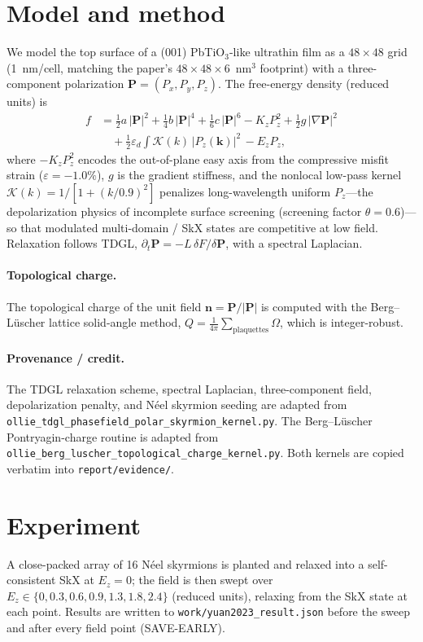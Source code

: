 \documentclass[11pt]{article}
\begin{document}
\section{Model and method}
We model the top surface of a (001) PbTiO$_3$-like ultrathin film as a
$48\times48$ grid (1~nm/cell, matching the paper's $48\times48\times6$~nm$^3$
footprint) with a three-component polarization $\mathbf{P}=(P_x,P_y,P_z)$. The
free-energy density (reduced units) is
\begin{align}
f &= \tfrac12 a\,|\mathbf{P}|^2 + \tfrac14 b\,|\mathbf{P}|^4
     + \tfrac16 c\,|\mathbf{P}|^6
   - K_z P_z^2
   + \tfrac12 g\,|\nabla \mathbf{P}|^2 \nonumber\\
  &\quad + \tfrac12 \varepsilon_d \!\!\int\! \mathcal{K}(k)\,|P_z(\mathbf{k})|^2\,
     - E_z P_z ,
\end{align}
where $-K_z P_z^2$ encodes the out-of-plane easy axis from the compressive misfit
strain ($\varepsilon=-1.0\%$), $g$ is the gradient stiffness, and the nonlocal
low-pass kernel $\mathcal{K}(k)=1/[1+(k/0.9)^2]$ penalizes long-wavelength
uniform $P_z$---the depolarization physics of incomplete surface screening
(screening factor $\theta=0.6$)---so that modulated multi-domain / SkX states are
competitive at low field. Relaxation follows TDGL,
$\partial_t \mathbf{P} = -L\,\delta F/\delta \mathbf{P}$, with a spectral
Laplacian.

\paragraph{Topological charge.} The topological charge of the unit field
$\mathbf{n}=\mathbf{P}/|\mathbf{P}|$ is computed with the Berg--L\"uscher lattice
solid-angle method, $Q=\frac{1}{4\pi}\sum_{\text{plaquettes}}\Omega$, which is
integer-robust.

\paragraph{Provenance / credit.} The TDGL relaxation scheme, spectral Laplacian,
three-component field, depolarization penalty, and N\'eel skyrmion seeding are
adapted from \texttt{ollie\_tdgl\_phasefield\_polar\_skyrmion\_kernel.py}. The
Berg--L\"uscher Pontryagin-charge routine is adapted from
\texttt{ollie\_berg\_luscher\_topological\_charge\_kernel.py}. Both kernels are
copied verbatim into \texttt{report/evidence/}.

\section{Experiment}
A close-packed array of 16 N\'eel skyrmions is planted and relaxed into a
self-consistent SkX at $E_z=0$; the field is then swept over
$E_z\in\{0,0.3,0.6,0.9,1.3,1.8,2.4\}$ (reduced units), relaxing from the SkX
state at each point. Results are written to \texttt{work/yuan2023\_result.json}
before the sweep and after every field point (SAVE-EARLY).
\end{document}
